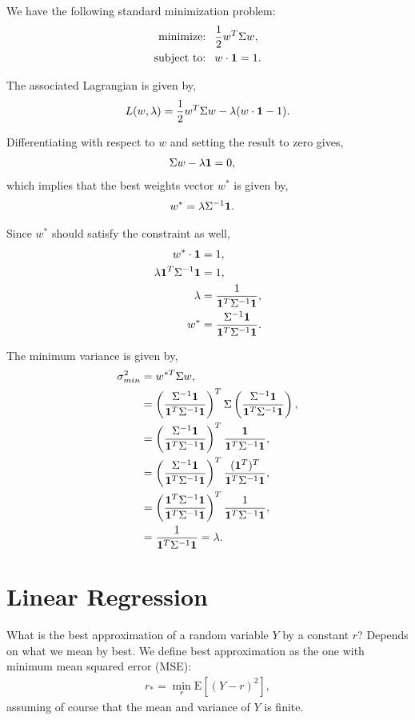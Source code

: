 \documentclass{amsart}
\theoremstyle{plain}
\numberwithin{equation}{section}
\begin{document}
We have the following standard minimization problem:
\begin{align*}
\textrm{minimize: }   ~ & \frac{1}{2} w^T\Sigma w,\\
\textrm{subject to: } ~ & w \cdot {\bf 1} = 1.
\end{align*}

The associated Lagrangian is given by,
\begin{align*}
L(w, \lambda) = \frac{1}{2} w^T\Sigma w - \lambda ( w \cdot {\bf 1} - 1 ).
\end{align*}

Differentiating with respect to $w$ and setting the result to zero gives,
\begin{align*}
\Sigma w - \lambda {\bf 1} & = 0,
\end{align*}
which implies that the best weights vector
$w^*$ is given by,
\begin{align*}
w^* &= \lambda \Sigma^{-1} {\bf 1}.
\end{align*}

Since $w^*$ should satisfy the constraint as well,
\begin{align*}
w^* \cdot {\bf 1} &= 1,\\
\lambda {\bf 1}^T \Sigma^{-1} {\bf 1} &= 1,\\
\lambda &=\frac{1}{{\bf 1}^T \Sigma^{-1} {\bf 1}},\\
w^* &=\frac{\Sigma^{-1} {\bf 1}}{{\bf 1}^T \Sigma^{-1} {\bf 1}}.
\end{align*}

The minimum variance is given by,
\begin{align*}
\sigma_{min}^2 &= w^{*T} \Sigma w,\\
&= \left(\frac{\Sigma^{-1} {\bf 1}}{{\bf 1}^T \Sigma^{-1} {\bf 1}}\right)^T
\Sigma \left(\frac{\Sigma^{-1} {\bf 1}}{{\bf 1}^T \Sigma^{-1} {\bf 1}}\right),\\
&=  \left(\frac{\Sigma^{-1} {\bf 1}}{{\bf 1}^T \Sigma^{-1} {\bf 1}}\right)^T
\frac{{\bf 1}}{{\bf 1}^T \Sigma^{-1} {\bf 1}},\\
&= \left(\frac{\Sigma^{-1} {\bf 1}}{{\bf 1}^T \Sigma^{-1} {\bf 1}}\right)^T
\frac{({\bf 1}^T)^T}{{\bf 1}^T \Sigma^{-1} {\bf 1}},\\
&= \left(\frac{{\bf 1}^T \Sigma^{-1} {\bf 1}}{{\bf 1}^T \Sigma^{-1} {\bf 1}}\right)^T
\frac{1}{{\bf 1}^T \Sigma^{-1} {\bf 1}},\\
&= \frac{1}{{\bf 1}^T \Sigma^{-1} {\bf 1}} = \lambda.
\end{align*}

\section*{Linear Regression}
What is the best approximation of a random variable $Y$ by a constant $r$? Depends on 
what we mean by best. We define best approximation as the one
with minimum mean squared error (MSE):
\begin{align*}
r_* = \min_{r} \mathrm{E}[(Y-r)^2],
\end{align*}
assuming of course that the mean and variance of $Y$ is finite. 
\end{document}
